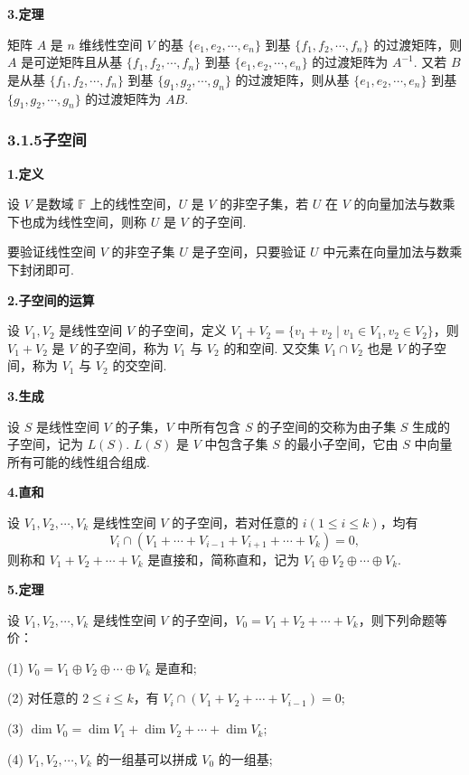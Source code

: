 \documentclass[UTF8, 12pt, fontset=fandol, oneside]{ctexart}
\begin{document}
\noindent\textbf{3.\quad 定理}

矩阵 $A$ 是 $n$ 维线性空间 $V$ 的基 $\{e_1,e_2,\cdots,e_n\}$ 到基 $\{f_1,f_2,\cdots,f_n\}$ 的过渡矩阵，则 $A$ 是可逆矩阵且从基 $\{f_1,f_2,\cdots,f_n\}$ 到基 $\{e_1,e_2,\cdots,e_n\}$ 的过渡矩阵为 $A^{-1}$. 又若 $B$ 是从基 $\{f_1,f_2,\cdots,f_n\}$ 到基 $\{g_1,g_2,\cdots,g_n\}$ 的过渡矩阵，则从基 $\{e_1,e_2,\cdots,e_n\}$ 到基 $\{g_1,g_2,\cdots,g_n\}$ 的过渡矩阵为 $AB$.

\subsubsection*{3.1.5\quad 子空间}

\noindent\textbf{1.\quad 定义}

设 $V$ 是数域 $\mathbb{F}$ 上的线性空间，$U$ 是 $V$ 的非空子集，若 $U$ 在 $V$ 的向量加法与数乘下也成为线性空间，则称 $U$ 是 $V$ 的子空间.

要验证线性空间 $V$ 的非空子集 $U$ 是子空间，只要验证 $U$ 中元素在向量加法与数乘下封闭即可.

\noindent\textbf{2.\quad 子空间的运算}

设 $V_1,V_2$ 是线性空间 $V$ 的子空间，定义 $V_1+V_2=\{v_1+v_2\mid v_1\in V_1,v_2\in V_2\}$，则 $V_1+V_2$ 是 $V$ 的子空间，称为 $V_1$ 与 $V_2$ 的和空间. 又交集 $V_1\cap V_2$ 也是 $V$ 的子空间，称为 $V_1$ 与 $V_2$ 的交空间.

\noindent\textbf{3.\quad 生成}

设 $S$ 是线性空间 $V$ 的子集，$V$ 中所有包含 $S$ 的子空间的交称为由子集 $S$ 生成的子空间，记为 $L(S)$. $L(S)$ 是 $V$ 中包含子集 $S$ 的最小子空间，它由 $S$ 中向量所有可能的线性组合组成.

\noindent\textbf{4.\quad 直和}

设 $V_1,V_2,\cdots,V_k$ 是线性空间 $V$ 的子空间，若对任意的 $i(1\le i\le k)$，均有
\[
V_i\cap(V_1+\cdots+V_{i-1}+V_{i+1}+\cdots+V_k)=0,
\]
则称和 $V_1+V_2+\cdots+V_k$ 是直接和，简称直和，记为 $V_1\oplus V_2\oplus\cdots\oplus V_k$.

\noindent\textbf{5.\quad 定理}

设 $V_1,V_2,\cdots,V_k$ 是线性空间 $V$ 的子空间，$V_0=V_1+V_2+\cdots+V_k$，则下列命题等价：

(1) $V_0=V_1\oplus V_2\oplus\cdots\oplus V_k$ 是直和;

(2) 对任意的 $2\le i\le k$，有 $V_i\cap(V_1+V_2+\cdots+V_{i-1})=0$;

(3) $\dim V_0=\dim V_1+\dim V_2+\cdots+\dim V_k$;

(4) $V_1,V_2,\cdots,V_k$ 的一组基可以拼成 $V_0$ 的一组基;
\end{document}

